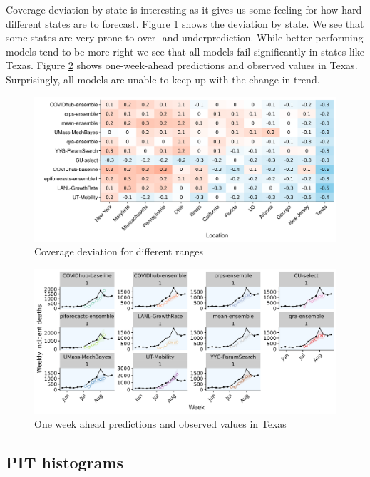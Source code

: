 \documentclass[
]{book}
\begin{document}
Coverage deviation by state is interesting as it gives us some feeling for how hard different states are to forecast. Figure \ref{fig:coverage-deviation-states} shows the deviation by state. We see that some states are very prone to over- and underprediction. While better performing models tend to be more right we see that all models fail significantly in states like Texas. Figure \ref{fig:pred-texas} shows one-week-ahead predictions and observed values in Texas. Surprisingly, all models are unable to keep up with the change in trend.

\begin{figure}
\includegraphics[width=1\linewidth]{../visualisation/chapter-5-results/heatmap-model-coverage} \caption{Coverage deviation for different ranges}\label{fig:coverage-deviation-states}
\end{figure}
\begin{figure}
\includegraphics[width=1\linewidth]{../visualisation/chapter-5-results/scenario-baseline/Texas-one-week} \caption{One week ahead predictions and observed values in Texas}\label{fig:pred-texas}
\end{figure}

\hypertarget{pit-histograms}{%
\subsection{PIT histograms}\label{pit-histograms}}
\end{document}
